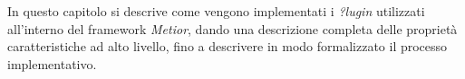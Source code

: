In questo capitolo si descrive come vengono implementati i \emph{?lugin} utilizzati all'interno del framework \emph{Metior},
dando una descrizione completa delle proprietà caratteristiche ad alto livello, fino a descrivere in modo formalizzato
il processo implementativo.
